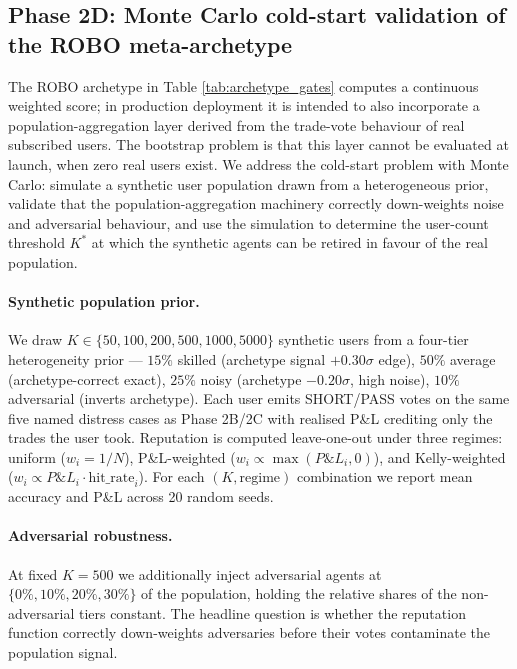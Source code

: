 \documentclass[11pt,a4paper]{article}
\begin{document}
\subsection{Phase 2D: Monte Carlo cold-start validation of the ROBO meta-archetype}\label{sec:results_robo_montecarlo}

The ROBO archetype in Table \ref{tab:archetype_gates} computes a continuous weighted score; in production deployment it is intended to also incorporate a population-aggregation layer derived from the trade-vote behaviour of real subscribed users. The bootstrap problem is that this layer cannot be evaluated at launch, when zero real users exist. We address the cold-start problem with Monte Carlo: simulate a synthetic user population drawn from a heterogeneous prior, validate that the population-aggregation machinery correctly down-weights noise and adversarial behaviour, and use the simulation to determine the user-count threshold $K^*$ at which the synthetic agents can be retired in favour of the real population.

\paragraph{Synthetic population prior.} We draw $K \in \{50, 100, 200, 500, 1000, 5000\}$ synthetic users from a four-tier heterogeneity prior --- $15\%$ skilled (archetype signal $+0.30\sigma$ edge), $50\%$ average (archetype-correct exact), $25\%$ noisy (archetype $-0.20\sigma$, high noise), $10\%$ adversarial (inverts archetype). Each user emits SHORT/PASS votes on the same five named distress cases as Phase 2B/2C with realised P\&L crediting only the trades the user took. Reputation is computed leave-one-out under three regimes: uniform ($w_i = 1/N$), P\&L-weighted ($w_i \propto \max(P\&L_i, 0)$), and Kelly-weighted ($w_i \propto P\&L_i \cdot \text{hit\_rate}_i$). For each $(K, \text{regime})$ combination we report mean accuracy and P\&L across 20 random seeds.

\paragraph{Adversarial robustness.} At fixed $K = 500$ we additionally inject adversarial agents at $\{0\%, 10\%, 20\%, 30\%\}$ of the population, holding the relative shares of the non-adversarial tiers constant. The headline question is whether the reputation function correctly down-weights adversaries before their votes contaminate the population signal.
\end{document}
